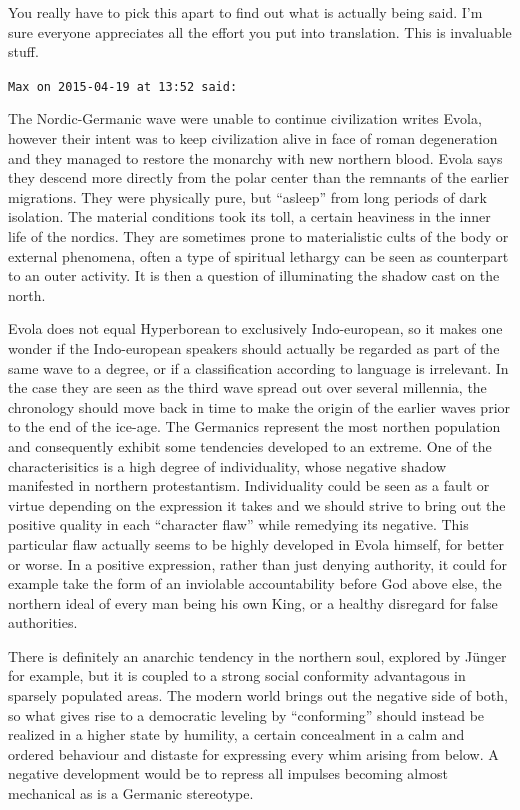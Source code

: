 \begin{footnotesize}
\begin{sffamily}
You really have to pick this apart to find out what is actually being said. I'm sure everyone appreciates all the effort you put into translation. This is invaluable stuff.

\hfill

\texttt{Max on 2015-04-19 at 13:52 said:}

The Nordic-Germanic wave were unable to continue civilization writes Evola, however their intent was to keep civilization alive in face of roman degeneration and they managed to restore the monarchy with new northern blood. Evola says they descend more directly from the polar center than the remnants of the earlier migrations. They were physically pure, but ``asleep'' from long periods of dark isolation. The material conditions took its toll, a certain heaviness in the inner life of the nordics. They are sometimes prone to materialistic cults of the body or external phenomena, often a type of spiritual lethargy can be seen as counterpart to an outer activity. It is then a question of illuminating the shadow cast on the north.

Evola does not equal Hyperborean to exclusively Indo-european, so it makes one wonder if the Indo-european speakers should actually be regarded as part of the same wave to a degree, or if a classification according to language is irrelevant. In the case they are seen as the third wave spread out over several millennia, the chronology should move back in time to make the origin of the earlier waves prior to the end of the ice-age. The Germanics represent the most northen population and consequently exhibit some tendencies developed to an extreme. One of the characterisitics is a high degree of individuality, whose negative shadow manifested in northern protestantism. Individuality could be seen as a fault or virtue depending on the expression it takes and we should strive to bring out the positive quality in each ``character flaw'' while remedying its negative. This particular flaw actually seems to be highly developed in Evola himself, for better or worse. In a positive expression, rather than just denying authority, it could for example take the form of an inviolable accountability before God above else, the northern ideal of every man being his own King, or a healthy disregard for false authorities.

There is definitely an anarchic tendency in the northern soul, explored by Jünger for example, but it is coupled to a strong social conformity advantagous in sparsely populated areas. The modern world brings out the negative side of both, so what gives rise to a democratic leveling by ``conforming'' should instead be realized in a higher state by humility, a certain concealment in a calm and ordered behaviour and distaste for expressing every whim arising from below. A negative development would be to repress all impulses becoming almost mechanical as is a Germanic stereotype.


\end{sffamily}
\end{footnotesize}
